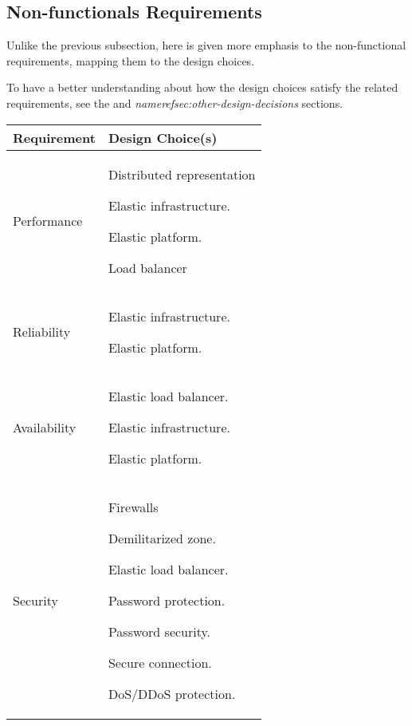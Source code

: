 \subsection{Non-functionals Requirements}

Unlike the previous subsection, here is given more emphasis to the non-functional requirements, mapping them to the design choices.

To have a better understanding about how the design choices satisfy the related requirements, see the \textit{} and \textit{nameref{sec:other-design-decisions}} sections.

\begin{longtable}{ |l|p{10cm}| }
	\hline
	\textbf{Requirement} & \textbf{Design Choice(s)}\\ \hline
	Performance & Distributed representation

Elastic infrastructure.

Elastic platform.

Load balancer\\ \hline

	Reliability & Elastic infrastructure.

Elastic platform.\\ \hline
	Availability & Elastic load balancer.

Elastic infrastructure.

Elastic platform.\\ \hline
	Security & Firewalls

Demilitarized zone.

Elastic load balancer.

Password protection.

Password security.

Secure connection.

DoS/DDoS protection.
\\ \hline
\end{longtable}
